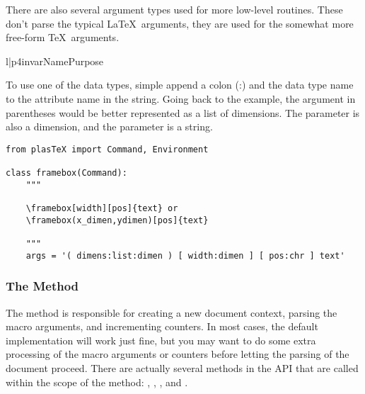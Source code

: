 There are also several argument types used for more low-level routines.
These don't parse the typical \LaTeX\ arguments, they are used for
the somewhat more free-form \TeX\ arguments.
\begin{tableii}{l|p{4in}}{var}{Name}{Purpose}
\end{tableii}

To use one of the data types, simple append a colon (:) and the data
type name to the attribute name in the  string.
Going back to the  example, the argument in
parentheses would be better represented as a list of dimensions.
The  parameter is also a dimension, and the  parameter
is a string.
\begin{verbatim}
from plasTeX import Command, Environment

class framebox(Command):
    """

    \framebox[width][pos]{text} or
    \framebox(x_dimen,ydimen)[pos]{text}

    """
    args = '( dimens:list:dimen ) [ width:dimen ] [ pos:chr ] text'
\end{verbatim}


\subsubsection{The  Method}

The  method is responsible for creating a new document
context, parsing the macro arguments, and incrementing counters.
In most cases, the default implementation will work just fine, but you
may want to do some extra processing of the macro arguments or
counters before letting the parsing of the document proceed.  There
are actually several methods in the API that are called within the
scope of the  method: , ,
, and .

